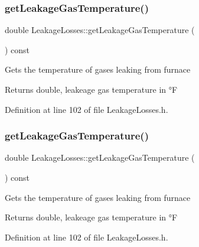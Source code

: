 \subsubsection{\texorpdfstring{get\+Leakage\+Gas\+Temperature()}{getLeakageGasTemperature()}\hspace{0.1cm}{\footnotesize\ttfamily [1/3]}}
{\footnotesize\ttfamily double Leakage\+Losses\+::get\+Leakage\+Gas\+Temperature (\begin{DoxyParamCaption}{ }\end{DoxyParamCaption}) const\hspace{0.3cm}{\ttfamily [inline]}}

Gets the temperature of gases leaking from furnace

\begin{DoxyReturn}{Returns}
double, leakeage gas temperature in °F 
\end{DoxyReturn}


Definition at line 102 of file Leakage\+Losses.\+h.

\mbox{\label{class_leakage_losses_a5dbb249c07bc91611b71d62610af7234}} 
\subsubsection{\texorpdfstring{get\+Leakage\+Gas\+Temperature()}{getLeakageGasTemperature()}\hspace{0.1cm}{\footnotesize\ttfamily [2/3]}}
{\footnotesize\ttfamily double Leakage\+Losses\+::get\+Leakage\+Gas\+Temperature (\begin{DoxyParamCaption}{ }\end{DoxyParamCaption}) const\hspace{0.3cm}{\ttfamily [inline]}}

Gets the temperature of gases leaking from furnace

\begin{DoxyReturn}{Returns}
double, leakeage gas temperature in °F 
\end{DoxyReturn}


Definition at line 102 of file Leakage\+Losses.\+h.

\mbox{\label{class_leakage_losses_a5dbb249c07bc91611b71d62610af7234}} 

